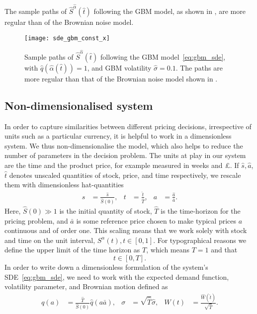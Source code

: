 \documentclass[main.tex]{subfiles}
\begin{document}
The sample paths of $\hat{S}^{\hat{\alpha}}(\hat{t})$ following the GBM model, as shown in
, are more regular
than of the Brownian noise model.
\begin{figure}[htbp]
  \centering
  \texttt{[image: sde\_gbm\_const\_x]}
  \caption{Sample paths of $\hat{S}^{\hat{\alpha}}(\hat{t})$ following the GBM
    model~\eqref{eq:gbm_sde}, with $\hat{q}(\hat{\alpha}(\hat{t}))=1$, and GBM volatility
    $\hat{\sigma} = 0.1$. The paths are  more regular than that of the
    Brownian noise model shown in .
  }\label{fig:sde_gbm_const_x}
\end{figure}

\subsection{Non-dimensionalised system}\label{subsec:nondimensionalisation}
In order to capture similarities between different pricing decisions, irrespective of units
such as a particular currency, it is helpful to work in a dimensionless system.
We thus non-dimensionalise the model, which also helps to reduce the
number of parameters in the decision problem.
The units at play in our system are the time and the product price,
for example measured in weeks and \pounds.
If $\hat{s},\hat{a}$, $\hat{t}$ denotes unscaled quantities of stock, price, and
time respectively, we rescale them with dimensionless hat-quantities
\begin{align}
  s&=\frac{\hat{s}}{\hat{S}(0)},&t &=\frac{\hat{t}}{\hat{T}},
  &a &= \frac{\hat{a}}{\bar{a}}.
\end{align}
Here, $\hat{S}(0)\gg 1$ is the initial quantity of stock, $\hat{T}$ is the time-horizon
for the pricing problem, and $\bar{a}$ is some reference price chosen
to make typical prices $a$ continuous and of order one.
This scaling means that we work solely with stock and time on the unit
interval, $S^{\alpha}(t),t\in[0,1]$.
For typographical reasons we define the upper limit of the time
horizon as $T$, which means $T=1$ and that
\begin{equation}
  t\in[0,T].
\end{equation}
In order to write down a dimensionless formulation of the system's
SDE~\eqref{eq:gbm_sde}, we need to work with the expected demand
function, volatility parameter, and Brownian motion defined as
\begin{align}
  q(a)&=\frac{\hat{T}}{\hat{S}(0)}\hat{q}(a \bar{a}),
  &\sigma &= \sqrt{\hat{T}}\hat{\sigma},
  &W(t) &= \frac{\hat{W}(\hat{t})}{ \sqrt{\hat{T}}}.
\end{align}
\end{document}
